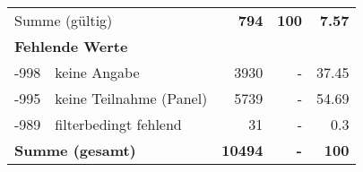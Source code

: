 \begin{longtable}{lXrrr}
     \midrule
     \multicolumn{2}{l}{Summe (gültig)} &
       \textbf{\num{794}} &
     \textbf{100} &
       \textbf{\num[round-mode=places,round-precision=2]{7,57}} \\
     \multicolumn{5}{l}{\textbf{Fehlende Werte}}\\
       -998 &
       keine Angabe &
         \num{3930} &
        - &
         \num[round-mode=places,round-precision=2]{37,45} \\
       -995 &
       keine Teilnahme (Panel) &
         \num{5739} &
        - &
         \num[round-mode=places,round-precision=2]{54,69} \\
       -989 &
       filterbedingt fehlend &
         \num{31} &
        - &
         \num[round-mode=places,round-precision=2]{0,3} \\
     \midrule
     \multicolumn{2}{l}{\textbf{Summe (gesamt)}} &
          \textbf{\num{10494}} &
        \textbf{-} &
        \textbf{100} \\
     \bottomrule
     \end{longtable}
     
